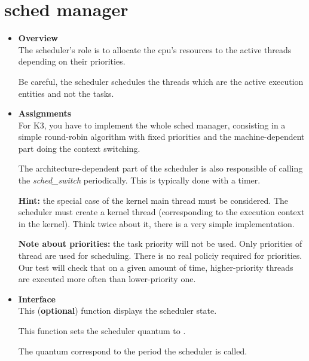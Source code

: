 %
%

\newpage

\section{\textbf{sched} manager}
\begin{itemize}
  \item {\bf Overview}\\

    The scheduler's role is to allocate the cpu's resources to the
    active threads depending on their priorities.

    Be careful, the scheduler schedules the threads which are the active
    execution entities and not the tasks.

  \item {\bf Assignments}\\

    For K3, you have to implement the whole sched manager, consisting
    in a simple round-robin algorithm with fixed priorities and the
    machine-dependent part doing the context switching.

    The architecture-dependent part of the scheduler is also
    responsible of calling the \emph{sched\_switch} periodically. This
    is typically done with a timer.

    \textbf{Hint:} the special case of the kernel main thread must be
    considered. The scheduler must create a kernel thread
    (corresponding to the execution context in the kernel). Think
    twice about it, there is a very simple implementation.

    \textbf{Note about priorities:} the task priority will not be
    used. Only priorities of thread are used for scheduling. There is
    no real policiy required for priorities. Our test will check that
    on a given amount of time, higher-priority threads are executed
    more often than lower-priority one.

  \item {\bf Interface}\\

	 {
	   This (\textbf{optional}) function displays the scheduler state.
	 }

	 {
	   This function sets the scheduler quantum to .

	   The quantum correspond to the period the scheduler is called.
	 }


\end{itemize}
